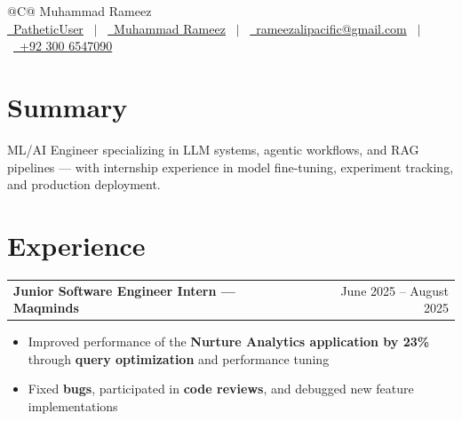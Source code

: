 \documentclass[a4paper,12pt]{article}
\makeatletter
\newenvironment{joblong}[2]
{
  \begin{tabularx}{\linewidth}{@{}l X r@{}}
  \textbf{#1} & \hfill & #2 \\
  \end{tabularx}
  \vspace{-8pt}
  \begin{itemize}[nosep,leftmargin=1.5em,itemsep=2pt,label=--]
}
{
  \end{itemize}
}
\makeatother
\begin{document}
\pagestyle{empty}

\begin{tabularx}{\linewidth}{@{}C@{}}
\huge{Muhammad Rameez} \\[4pt]
\small{
\href{https://github.com/PatheticUser}{\raisebox{-0.05\height}\faGithub\ PatheticUser} \ $|$ \ 
\href{https://linkedin.com/in/muhammad-rameez-600619249}{\raisebox{-0.05\height}\faLinkedin\ Muhammad Rameez} \ $|$ \ 
\href{mailto:rameezalipacific@gmail.com}{\raisebox{-0.05\height}\faEnvelope \ rameezalipacific@gmail.com} \ $|$ \ 
\href{tel:+923006547090}{\raisebox{-0.05\height}\faMobile \ +92 300 6547090}
}
\end{tabularx}

\vspace{-4pt}

\section{Summary}
ML/AI Engineer specializing in LLM systems, agentic workflows, and RAG pipelines — with internship experience in model fine-tuning, experiment tracking, and production deployment.

\section{Experience}

\begin{joblong}{Junior Software Engineer Intern — Maqminds}{June 2025 -- August 2025}
\item Improved performance of the \textbf{Nurture Analytics application by 23\%} through \textbf{query optimization} and performance tuning
\item Fixed \textbf{bugs}, participated in \textbf{code reviews}, and debugged new feature implementations
\end{joblong}

\vspace{4pt}
\end{document}
